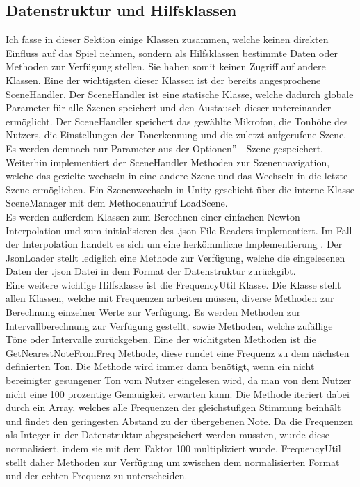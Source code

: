 \subsection*{Datenstruktur und Hilfsklassen}
Ich fasse in dieser Sektion einige Klassen zusammen, welche keinen direkten Einfluss auf das Spiel nehmen, sondern als Hilfsklassen bestimmte Daten oder Methoden zur Verfügung stellen. Sie haben somit keinen Zugriff auf andere Klassen. Eine der wichtigsten dieser Klassen ist der bereits angesprochene SceneHandler. Der SceneHandler ist eine statische Klasse, welche dadurch globale Parameter für alle Szenen speichert und den Austausch dieser untereinander ermöglicht. Der SceneHandler speichert das gewählte Mikrofon, die Tonhöhe des Nutzers, die Einstellungen der Tonerkennung und die zuletzt aufgerufene Szene. Es werden demnach nur Parameter aus der \glqq Optionen'' - Szene gespeichert. Weiterhin implementiert der SceneHandler Methoden zur Szenennavigation, welche das gezielte wechseln in eine andere Szene und das Wechseln in die letzte Szene ermöglichen. Ein Szenenwechseln in Unity geschieht über die interne Klasse SceneManager mit dem Methodenaufruf LoadScene. \\
Es werden außerdem Klassen zum Berechnen einer einfachen Newton Interpolation und zum initialisieren des .json File Readers implementiert. Im Fall der Interpolation handelt es sich um eine herkömmliche Implementierung \cite{newtonInterpolation}. Der JsonLoader stellt lediglich eine Methode zur Verfügung, welche die eingelesenen Daten der .json Datei in dem Format der Datenstruktur zurückgibt. \\
Eine weitere wichtige Hilfsklasse ist die FrequencyUtil Klasse. Die Klasse stellt allen Klassen, welche mit Frequenzen arbeiten müssen, diverse Methoden zur Berechnung einzelner Werte zur Verfügung. Es werden Methoden zur Intervallberechnung zur Verfügung gestellt, sowie Methoden, welche zufällige Töne oder Intervalle zurückgeben. Eine der wichitgsten Methoden ist die GetNearestNoteFromFreq Methode, diese rundet eine Frequenz zu dem nächsten definierten Ton. Die Methode wird immer dann benötigt, wenn ein nicht bereinigter gesungener Ton vom Nutzer eingelesen wird, da man von dem Nutzer nicht eine 100 prozentige Genauigkeit erwarten kann. Die Methode iteriert dabei durch ein Array, welches alle Frequenzen der gleichstufigen Stimmung beinhält und findet den geringesten Abstand zu der übergebenen Note. Da die Frequenzen als Integer in der Datenstruktur abgespeichert werden mussten, wurde diese normalisiert, indem sie mit dem Faktor 100 multipliziert wurde. FrequencyUtil stellt daher Methoden zur Verfügung um zwischen dem normalisierten Format und der echten Frequenz zu unterscheiden. \\
